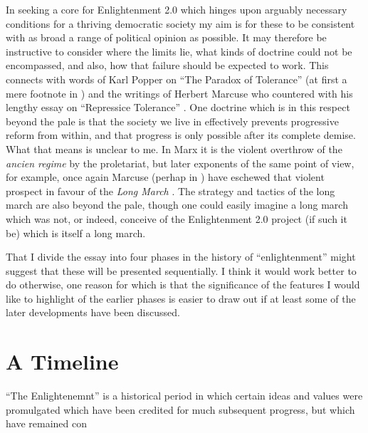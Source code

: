 \documentclass[10pt,titlepage]{article}
\begin{document}
In seeking a core for Enlightenment 2.0 which hinges upon arguably necessary conditions for a thriving democratic society my aim is for these to be consistent with as broad a range of political opinion as possible.
It may therefore be instructive to consider where the limits lie, what kinds of doctrine could not be encompassed, and also, how that failure should be expected to work.
This connects with words of Karl Popper on ``The Paradox of Tolerance'' (at first a mere footnote in \cite{popper-ose}) and the writings of Herbert Marcuse who countered with his lengthy essay on ``Repressice Tolerance'' \cite{marcuse-repressive}.
One doctrine which is in this respect beyond the pale is that the society we live in effectively prevents progressive reform from within, and that progress is only possible after its complete demise.
What that means is unclear to me.
In Marx it is the violent overthrow of the \emph{ancien regime} by the proletariat, but later exponents of the same point of view, for example, once again Marcuse (perhap in \cite{marcuse-liberation}) have eschewed that violent prospect in favour of the \emph{Long March} \cite{sidwell-long}.
The strategy and tactics of the long march are also beyond the pale, though one could easily imagine a long march which was not, or indeed, conceive of the Enlightenment 2.0 project (if such it be) which is itself a long march.


That I divide the essay into four phases in the history of ``enlightenment'' might suggest that these will be presented sequentially.
I think it would work better to do otherwise, one reason for which is that the significance of the features I would like to highlight of the earlier phases is easier to draw out if at least some of the later developments have been discussed.

\section{A Timeline}

``The Enlightenemnt'' is a historical period in which certain ideas and values were promulgated which have been credited for much subsequent progress, but which have remained con
\end{document}

